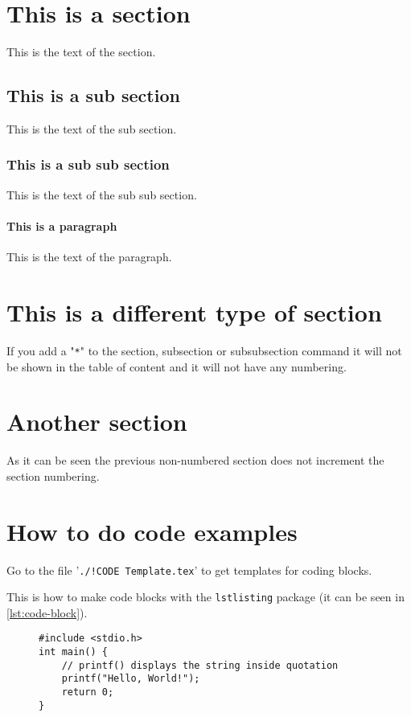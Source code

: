 \section{This is a section}
This is the text of the section.

\subsection{This is a sub section}
This is the text of the sub section.


\subsubsection{This is a sub sub section}
This is the text of the sub sub section.

\paragraph{This is a paragraph}
This is the text of the paragraph.

\section*{This is a different type of section}
If you add a "\texttt{*}" to the section, subsection or subsubsection command
it will not be shown in the table of content and it will not have any numbering.

\section{Another section}
As it can be seen the previous non-numbered section does not increment the
section numbering.


\section{How to do code examples}

Go to the file '\texttt{./!CODE Template.tex}' to get templates for coding blocks.

This is how to make code blocks with the \texttt{lstlisting} package (it can be
seen in \autoref{lst:code-block}).
\begin{figure}[h]
\begin{lstlisting}[label={lst:code-block},caption={This is the caption of the
    code example},style=CSharpStyle]
#include <stdio.h>
int main() {
    // printf() displays the string inside quotation
    printf("Hello, World!");
    return 0;
}
\end{lstlisting}
\end{figure}

